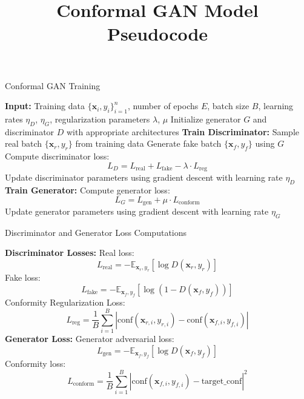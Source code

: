 \documentclass{article}
\begin{document}
\title{Conformal GAN Model Pseudocode}
\author{}
\date{}
\maketitle



\begin{algorithm}[ht]
\caption{Conformal GAN Training}
\begin{algorithmic}[1]
\STATE \textbf{Input:} Training data $\{ \mathbf{x}_i, y_i \}_{i=1}^n$, number of epochs $E$, batch size $B$, learning rates $\eta_D$, $\eta_G$, regularization parameters $\lambda$, $\mu$
\STATE Initialize generator $G$ and discriminator $D$ with appropriate architectures
        \STATE \textbf{Train Discriminator:}
        \STATE Sample real batch $\{ \mathbf{x}_r, y_r \}$ from training data
        \STATE Generate fake batch $\{ \mathbf{x}_f, y_f \}$ using $G$
        \STATE Compute discriminator loss:
        \[
        L_D = L_{\text{real}} + L_{\text{fake}} - \lambda \cdot L_{\text{reg}}
        \]
        \STATE Update discriminator parameters using gradient descent with learning rate $\eta_D$
        \STATE \textbf{Train Generator:}
        \STATE Compute generator loss:
        \[
        L_G = L_{\text{gen}} + \mu \cdot L_{\text{conform}}
        \]
        \STATE Update generator parameters using gradient descent with learning rate $\eta_G$
    \ENDFOR
\ENDFOR
\end{algorithmic}
\end{algorithm}


\begin{algorithm}[ht]
\caption{Discriminator and Generator Loss Computations}
\begin{algorithmic}[1]
\STATE \textbf{Discriminator Losses:}
\STATE Real loss:
\[
L_{\text{real}} = -\mathbb{E}_{\mathbf{x}_r, y_r} [ \log D(\mathbf{x}_r, y_r) ]
\]
\STATE Fake loss:
\[
L_{\text{fake}} = -\mathbb{E}_{\mathbf{x}_f, y_f} [ \log (1 - D(\mathbf{x}_f, y_f)) ]
\]
\STATE Conformity Regularization Loss:
\[
L_{\text{reg}} = \frac{1}{B} \sum_{i=1}^B | \text{conf}(\mathbf{x}_{r,i}, y_{r,i}) - \text{conf}(\mathbf{x}_{f,i}, y_{f,i}) |
\]
\STATE \textbf{Generator Loss:}
\STATE Generator adversarial loss:
\[
L_{\text{gen}} = -\mathbb{E}_{\mathbf{x}_f, y_f} [ \log D(\mathbf{x}_f, y_f) ]
\]
\STATE Conformity loss:
\[
L_{\text{conform}} = \frac{1}{B} \sum_{i=1}^B | \text{conf}(\mathbf{x}_{f,i}, y_{f,i}) - \text{target\_conf} |^2
\]
\end{algorithmic}
\end{algorithm}
\end{document}
